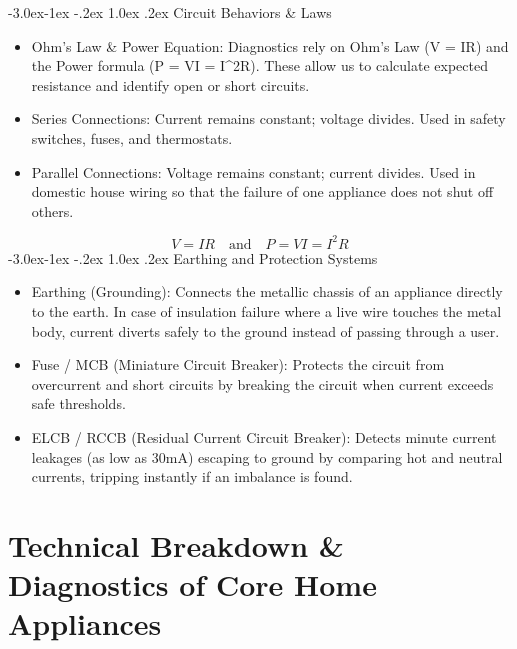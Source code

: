 \documentclass[11pt,a4paper]{report}
\makeatletter
\renewcommand{\subsection}{\@startsection{subsection}{2}{\z@}%
  {-3.0ex\@plus -1ex \@minus -.2ex}%
  {1.0ex \@plus .2ex}%
  {\normalfont\large\bfseries\color{secondaryColor}}}
\makeatother
\begin{document}
\subsection{Circuit Behaviors \& Laws}
\begin{itemize}
  \item Ohm's Law \& Power Equation: Diagnostics rely on Ohm's Law (V = IR) and the Power formula (P = VI = I\textasciicircum{}2R). These allow us to calculate expected resistance and identify open or short circuits.
  \item Series Connections: Current remains constant; voltage divides. Used in safety switches, fuses, and thermostats.
  \item Parallel Connections: Voltage remains constant; current divides. Used in domestic house wiring so that the failure of one appliance does not shut off others.
\end{itemize}
\begin{equation}V = IR \quad \text{and} \quad P = VI = I^2 R\end{equation}
\subsection{Earthing and Protection Systems}
\begin{itemize}
  \item Earthing (Grounding): Connects the metallic chassis of an appliance directly to the earth. In case of insulation failure where a live wire touches the metal body, current diverts safely to the ground instead of passing through a user.
  \item Fuse / MCB (Miniature Circuit Breaker): Protects the circuit from overcurrent and short circuits by breaking the circuit when current exceeds safe thresholds.
  \item ELCB / RCCB (Residual Current Circuit Breaker): Detects minute current leakages (as low as 30mA) escaping to ground by comparing hot and neutral currents, tripping instantly if an imbalance is found.
\end{itemize}
\chapter{Technical Breakdown \& Diagnostics of Core Home Appliances}
\end{document}
